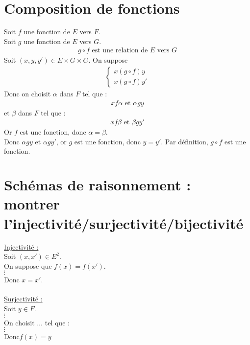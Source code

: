 \documentclass[../main.tex]{subfiles}
\begin{document}
\section{Composition de fonctions}
Soit $f$ une fonction de $E$ vers $F$. \\
Soit $g$ une fonction de $E$ vers $G$. \\
\begin{align*}
    g \circ f \text{ est une relation de } E \text{ vers } G
\end{align*}
Soit $(x, y, y') \in E \times G \times G$. 
On suppose
\begin{align*}
    \begin{cases}
        x (g \circ f) y \\
        x (g \circ f) y'
    \end{cases}
\end{align*}
Donc on choisit $\alpha$ dans $F$ tel que : 
\begin{align*}
    xf\alpha \text{ et } \alpha gy
\end{align*}
et $\beta$ dans $F$ tel que :
\begin{align*}
    xf\beta \text{ et } \beta gy' 
\end{align*}
Or $f$ est une fonction, donc $\alpha = \beta$. \\
Donc $\alpha g y \text{ et } \alpha g y'$, or $g$ est une fonction, donc $y = y'$.
Par définition, $g \circ f$ est une fonction.

\setcounter{section}{29}
\section{Schémas de raisonnement : montrer l'injectivité/surjectivité/bijectivité}
\underline{Injectivité :} \\
Soit $(x, x') \in E^2$. \\
On suppose que $f(x) = f(x')$. \\
$\vdots$ \\
Donc $x = x'$. \\ \\

\underline{Surjectivité :} \\
Soit $y \in F$. \\
$\vdots$ \\
On choisit $\ldots$ tel que : \\
$\vdots$ \\
Donc$f(x) = y$ \\ \\
\end{document}
